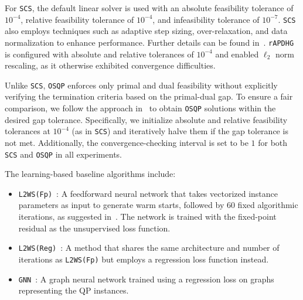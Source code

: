 \documentclass[10pt]{article} %
\begin{document}
For \texttt{SCS}, the default linear solver is used with an absolute feasibility tolerance of $10^{-4}$, relative feasibility tolerance of $10^{-4}$, and infeasibility tolerance of $10^{-7}$. \texttt{SCS} also employs techniques such as adaptive step sizing, over-relaxation, and data normalization to enhance performance. Further details can be found in~\citet{o2021operator}.
\texttt{rAPDHG} is configured with absolute and relative tolerances of $10^{-4}$ and enabled $\ell_2$ norm rescaling, as it otherwise exhibited convergence difficulties.

Unlike \texttt{SCS}, \texttt{OSQP} enforces only primal and dual feasibility without explicitly verifying the termination criteria based on the primal-dual gap. 
To ensure a fair comparison, we follow the approach in~\citet{lu2023pdqp,o2021operator} to obtain \texttt{OSQP} solutions within the desired gap tolerance. 
Specifically, we initialize absolute and relative feasibility tolerances at $10^{-4}$ (as in \texttt{SCS}) and iteratively halve them if the gap tolerance is not met. 
Additionally, the convergence-checking interval is set to be $1$ for both \texttt{SCS} and \texttt{OSQP} in all experiments.


The learning-based baseline algorithms include:
\begin{itemize}
    \item[(i)] \texttt{L2WS(Fp)}~\citep{sambharya2024learning}: A feedforward neural network that takes vectorized instance parameters as input to generate warm starts, followed by $60$ fixed algorithmic iterations, as suggested in~\citet{sambharya2024learning}. The network is trained with the fixed-point residual as the unsupervised loss function.
    \item[(ii)] \texttt{L2WS(Reg)}~\citep{sambharya2024learning}: A method that shares the same architecture and number of iterations as \texttt{L2WS(Fp)} but employs a regression loss function instead.
    \item[(iii)] \texttt{GNN}~\citep{chen2024gnn}: A graph neural network trained using a regression loss on graphs representing the QP instances.
\end{itemize}
\end{document}
